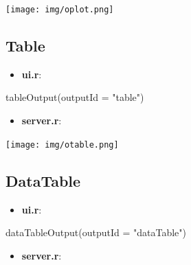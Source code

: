 \documentclass[
]{article}
\newenvironment{Shaded}{\begin{snugshade}}{\end{snugshade}}
\newcommand{\AttributeTok}[1]{\textcolor[rgb]{0.77,0.63,0.00}{#1}}
\newcommand{\FunctionTok}[1]{\textcolor[rgb]{0.00,0.00,0.00}{#1}}
\newcommand{\NormalTok}[1]{#1}
\newcommand{\OtherTok}[1]{\textcolor[rgb]{0.56,0.35,0.01}{#1}}
\newcommand{\SpecialCharTok}[1]{\textcolor[rgb]{0.00,0.00,0.00}{#1}}
\newcommand{\StringTok}[1]{\textcolor[rgb]{0.31,0.60,0.02}{#1}}
\providecommand{\tightlist}{%
  \setlength{\itemsep}{0pt}\setlength{\parskip}{0pt}}
\begin{document}
\texttt{[image: img/oplot.png]}

\hypertarget{table}{%
\subsection{Table}\label{table}}

\begin{itemize}
\tightlist
\item
  \textbf{ui.r}:
\end{itemize}

\begin{Shaded}
\begin{Highlighting}[]
\FunctionTok{tableOutput}\NormalTok{(}\AttributeTok{outputId =} \StringTok{"table"}\NormalTok{)}
\end{Highlighting}
\end{Shaded}

\begin{itemize}
\tightlist
\item
  \textbf{server.r}:
\end{itemize}

\begin{Shaded}
\end{Shaded}

\texttt{[image: img/otable.png]}

\hypertarget{datatable}{%
\subsection{DataTable}\label{datatable}}

\begin{itemize}
\tightlist
\item
  \textbf{ui.r}:
\end{itemize}

\begin{Shaded}
\begin{Highlighting}[]
\FunctionTok{dataTableOutput}\NormalTok{(}\AttributeTok{outputId =} \StringTok{"dataTable"}\NormalTok{)}
\end{Highlighting}
\end{Shaded}

\begin{itemize}
\tightlist
\item
  \textbf{server.r}:
\end{itemize}
\end{document}
